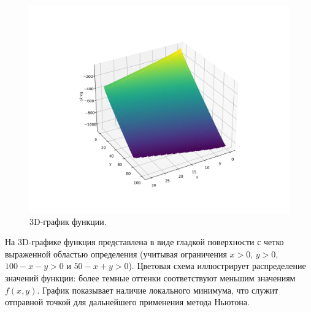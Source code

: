\documentclass[a4paper,12pt]{article}
\begin{document}
\begin{figure}[H]
    \centering
    \includegraphics[width=\textwidth]{images/3d_function.png}
    \caption{3D-график функции.}
\end{figure}
\noindent На 3D-графике функция представлена в виде гладкой поверхности с четко выраженной областью определения (учитывая ограничения \(x>0\), \(y>0\), \(100-x-y>0\) и \(50-x+y>0\)). Цветовая схема иллюстрирует распределение значений функции: более темные оттенки соответствуют меньшим значениям \(f(x,y)\). График показывает наличие локального минимума, что служит отправной точкой для дальнейшего применения метода Ньютона.
\end{document}
